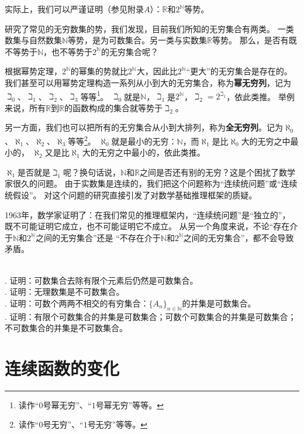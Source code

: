 \documentclass[12pt,UTF8]{ctexbook}
\begin{document}
实际上，我们可以严谨证明（参见附录$A$）：$\mathbb{R}$和$2^\mathbb{N}$等势。

研究了常见的无穷数集的势，我们发现，目前我们所知的无穷集合有两类。
一类数集与自然数集$\mathbb{N}$等势，是为可数集合。另一类与实数集$\mathbb{R}$等势。
那么，是否有既不等势于$\mathbb{N}$，也不等势于$2^\mathbb{N}$的无穷集合呢？

根据幂势定理，$2^\mathbb{N}$的幂集的势就比$2^\mathbb{N}$大，因此比$2^\mathbb{N}$“更大”的无穷集合是存在的。
我们甚至可以用幂势定理构造一系列从小到大的无穷集合，称为\textbf{幂无穷列}，记为$\beth_0$、$\beth_1$、$\beth_2$、$\beth_3$等等\footnote{读作“$0$号幂无穷”、“$1$号幂无穷”等等。}。
$\beth_0$就是$\mathbb{N}$，$\beth_1$是$2^\mathbb{N}$，$\beth_2 = 2^{\beth_1}$，依此类推。
举例来说，所有$\mathbb{R}$到$\mathbb{R}$的函数构成的集合就等势于$\beth_2$。

另一方面，我们也可以把所有的无穷集合从小到大排列，称为\textbf{全无穷列}。记为$\aleph_0$、$\aleph_1$、$\aleph_2$、$\aleph_3$等等\footnote{读作“$0$号无穷”、“$1$号无穷”等等。}。
$\aleph_0$就是最小的无穷：$\mathbb{N}$，而$\aleph_1$是比$\aleph_0$大的无穷之中最小的，
$\aleph_2$又是比$\aleph_1$大的无穷之中最小的，依此类推。

$\aleph_1$是否就是$\beth_1$呢？换句话说，$\mathbb{N}$和$\mathbb{R}$之间是否还有别的无穷？这是个困扰了数学家很久的问题。
由于实数集是连续的，我们把这个问题称为“连续统问题”或“连续统假设”。
对这个问题的研究直接引发了对数学基础推理框架的质疑。

1963年，数学家证明了：在我们常见的推理框架内，“连续统问题”是“独立的”，
既不可能证明它成立，也不可能证明它不成立。
从另一个角度来说，不论“存在介于$\mathbb{N}$和$2^\mathbb{N}$之间的无穷集合”还是
“不存在介于$\mathbb{N}$和$2^\mathbb{N}$之间的无穷集合”，都不会导致矛盾。

\begin{xt}
    \mbox{} \\
    . 证明：可数集合去除有限个元素后仍然是可数集合。\\
    . 证明：无理数集是不可数集合。\\
    . 证明：可数个两两不相交的有穷集合：$\{A_n\}_{n\in\mathbb{N}}$的并集是可数集合。\\
    . 证明：有限个可数集合的并集是可数集合；可数个可数集合的并集是可数集合；不可数集合的并集是不可数集合。
\end{xt}

\chapter{连续函数的变化}
\end{document}
